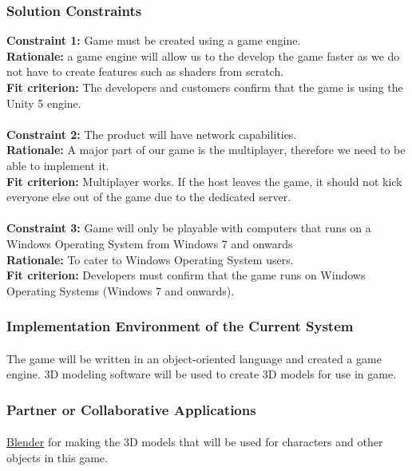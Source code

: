 \documentclass[12pt, titlepage]{article}
\begin{document}
\subsubsection{Solution Constraints}
\textbf{Constraint 1:} Game must be created using a game engine.\\
\textbf{Rationale:} a game engine will allow us to the develop the game faster as we do not have to create features such as shaders from scratch.\\
\textbf{Fit criterion:} The developers and customers confirm that the game is using the Unity 5 engine.
\\\\
\textbf{Constraint 2:} The product will have network capabilities.\\
\textbf{Rationale:} A major part of our game is the multiplayer, therefore we need to be able to implement it. \\
\textbf{Fit criterion:} Multiplayer works. If the host leaves the game, it should not kick everyone else out of the game due to the dedicated server.
\\\\
\textbf{Constraint 3:} Game will only be playable with computers that runs on a Windows Operating System from Windows 7 and onwards\\ 
\textbf{Rationale:} To cater to Windows Operating System users.\\
\textbf{Fit criterion:} Developers must confirm that the game runs on Windows Operating Systems (Windows 7 and onwards).

\subsubsection{Implementation Environment of the Current System}
\paragraph{}The game will be written in an object-oriented language and created a game engine. 3D modeling software will be used to create 3D models for use in game. 
\subsubsection{Partner or Collaborative Applications}
\paragraph{}\href{https://www.blender.org/}{Blender} for making the 3D models that will be used for characters and other objects in this game.
\end{document}
